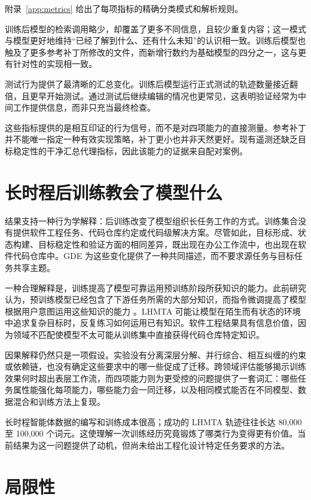 \documentclass[10pt]{article}
\begin{document}
附录~\ref{app:metrics} 给出了每项指标的精确分类模式和解析规则。

训练后模型的检索调用略少，却覆盖了更多不同信息，且较少重复内容；这一模式与模型更好地维持“已经了解到什么、还有什么未知”的认识相一致。训练后模型也触及了更多参考补丁所修改的文件，而新增行数约为基础模型的四分之一，这与更有针对性的实现相一致。

测试行为提供了最清晰的汇总变化。训练后模型运行正式测试的轨迹数量接近翻倍，且更早开始测试。通过测试后继续编辑的情况也更常见，这表明验证经常为中间工作提供信息，而非只充当最终检查。

这些指标提供的是相互印证的行为信号，而不是对四项能力的直接测量。参考补丁并不能唯一指定一种有效实现策略，补丁更小也并非天然更好。现有遥测还缺乏目标稳定性的干净汇总代理指标，因此该能力的证据来自配对案例。

\section{长时程后训练教会了模型什么}
\label{sec:discussion}

结果支持一种行为学解释：后训练改变了模型组织长任务工作的方式。训练集合没有提供软件工程任务、代码仓库约定或代码级解决方案。尽管如此，目标形成、状态构建、目标稳定性和验证方面的相同差异，既出现在办公工作流中，也出现在软件代码仓库中。GDE 为这些变化提供了一种共同描述，而不要求源任务与目标任务共享主题。

一种合理解释是，训练提高了模型可靠运用预训练阶段所获知识的能力。此前研究认为，预训练模型已经包含了下游任务所需的大部分知识，而指令微调提高了模型根据用户意图运用这些知识的能力 \citep{zhou2023lima, ouyang2022instructions}。LHMTA 可能让模型在陌生而有状态的环境中追求复杂目标时，反复练习如何运用已有知识。软件工程结果具有信息价值，因为领域不匹配使模型不太可能从训练集中直接获得代码仓库特定知识。

因果解释仍然只是一项假设。实验没有分离深层分解、并行综合、相互纠缠的约束或依赖链，也没有确定这些要求中的哪一些促成了迁移。跨领域评估能够揭示训练效果何时超出表层工作流，而四项能力则为更受控的问题提供了一套词汇：哪些任务属性能强化每项能力，哪些能力会一同迁移，以及相同模式能否在不同模型、数据混合和训练方法上复现。

长时程智能体数据的编写和训练成本很高；成功的 LHMTA 轨迹往往长达 80,000 至 100,000 个词元。这使理解一次训练经历究竟锻炼了哪类行为变得更有价值。当前结果为这一问题提供了动机，但尚未给出工程化设计特定任务要求的方法。

\section{局限性}
\label{sec:limitations}
\end{document}
